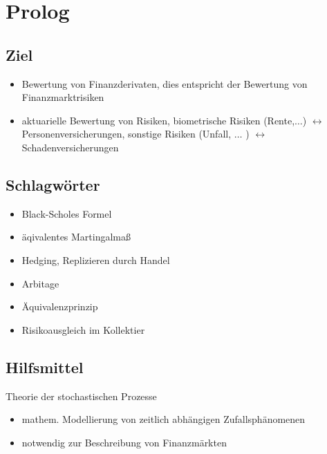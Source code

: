 \thispagestyle{empty}

\section*{Prolog}  %
\label{sec:prolog}

\subsection*{Ziel} %
\label{sub:ziel}

\begin{itemize}
	\item Bewertung von Finanzderivaten, dies entspricht der Bewertung von Finanzmarktrisiken
	\item aktuarielle Bewertung von Risiken, biometrische Risiken (Rente,$\dots$) $\leftrightarrow$ Personenversicherungen,
	sonstige Risiken (Unfall, $\dots$ ) $\leftrightarrow$ Schadenversicherungen
\end{itemize}

\subsection*{Schlagwörter} %
\label{sub: schlagwörter}

\begin{itemize}
	\item Black-Scholes Formel
	\item äqivalentes Martingalmaß
	\item Hedging, Replizieren durch Handel
	\item Arbitage
	\item Äquivalenzprinzip
	\item Risikoausgleich im Kollektier
\end{itemize}

\subsection*{Hilfsmittel} %
\label{sub:hilfsmittel}

Theorie der stochastischen Prozesse
\begin{itemize}
	\item mathem. Modellierung von zeitlich abhängigen Zufallsphänomenen
	\item notwendig zur Beschreibung von Finanzmärkten
\end{itemize}

